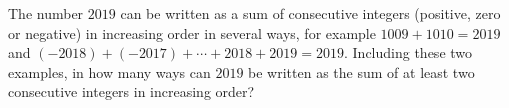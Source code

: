 The number $2019$ can be written as a sum of consecutive integers (positive, zero or negative) in increasing order in several ways, for example $1009+1010=2019$ and $(-2018)+(-2017)+\cdots+2018+2019=2019$. Including these two examples, in how many ways can $2019$ be written as the sum of at least two consecutive integers in increasing order?
